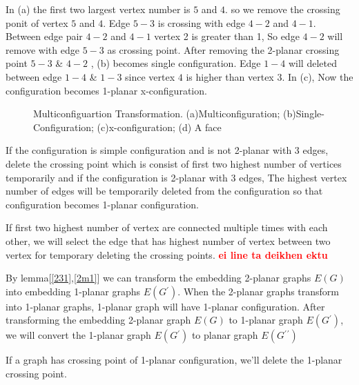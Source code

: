 \begin{enumerate}
In (a) the first two largest vertex number is $5$ and $4$. so we remove the crossing ponit of vertex $5$ and $4$. Edge $5-3$ is crossing with edge $4-2$ and $4-1$. Between edge pair $4-2$ and $4-1$ vertex 2 is greater than 1, So edge $4-2$ will remove with edge $5-3$ as crossing point. After removing the 2-planar crossing point $5-3$ \& $4-2$ , (b) becomes single configuration. Edge $1-4$ will deleted between edge $1-4$ \& $1-3$ since vertex $4$ is higher than vertex $3$. In (c), Now the configuration becomes 1-planar x-configuration.  

\begin{figure}[!tb]
\centering
\resizebox{150mm}{!}{}
\caption{Multiconfiguartion Transformation. (a)Multiconfiguration; (b)Single-Configuration; (c)x-configuration; (d) A face}
\label{fig:multistar}
\end{figure}


\end{enumerate}

\begin{lemma}
\label{231}
If the configuration is simple configuration and is not 2-planar with 3 edges, delete the crossing point which is consist of first two highest number of vertices temporarily and if the configuration is 2-planar with 3 edges, The highest vertex number of edges will be temporarily deleted from the configuration so that configuration becomes 1-planar configuration.
\end{lemma}



\begin{lemma}
\label{2m1}
If first two highest number of vertex are connected multiple times with each other, we will select the edge that has highest number of vertex between two vertex for temporary deleting the crossing points. \textbf{\textcolor{red}{ei line ta deikhen ektu}}
\end{lemma}

By lemma[\ref{231},\ref{2m1}] we can transform the embedding 2-planar graphs $E(G)$ into embedding 1-planar graphs $E(G{^\prime})$. When the 2-planar graphs transform into 1-planar graphs, 1-planar graph will have 1-planar configuration. After transforming the embedding 2-planar graph $E(G)$ to 1-planar graph $E(G{^\prime})$, we will convert the 1-planar graph $E(G{^\prime})$ to planar graph $E(G{^\prime}{^\prime})$


\begin{lemma}
\label{1pcp}
If a graph has crossing point of 1-planar configuration, we'll delete the 1-planar crossing point.
\end{lemma}

